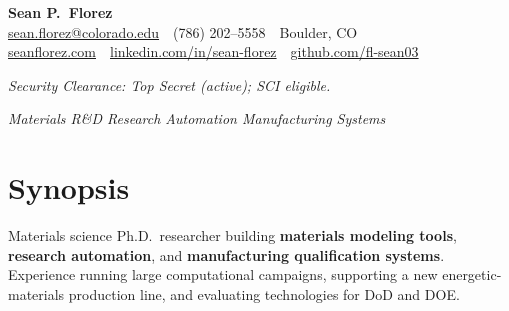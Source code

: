 \documentclass[letterpaper,10pt]{article}
\newcommand{\keepsection}{\needspace{6\baselineskip}}
\begin{document}
\pagestyle{empty}

\begin{center}
    {\LARGE \textbf{Sean P.\ Florez}}\\
    \href{mailto:sean.florez@colorado.edu}{sean.florez@colorado.edu} \,\textbar\, (786) 202--5558 \,\textbar\, Boulder, CO\\
    \href{https://seanflorez.com}{seanflorez.com} \,\textbar\,
    \href{https://linkedin.com/in/sean-florez}{linkedin.com/in/sean-florez} \,\textbar\,
    \href{https://github.com/fl-sean03}{github.com/fl-sean03}
\end{center}

\vspace{-2pt}
\begin{center}
\textit{Security Clearance: Top Secret (active); SCI eligible.}
\end{center}

\vspace{-6pt}
\begin{center}
\textit{Materials R\&D \;\textbar\; Research Automation \;\textbar\; Manufacturing Systems}
\end{center}

\keepsection\section*{Synopsis}
Materials science Ph.D.\ researcher building \textbf{materials modeling tools}, \textbf{research automation}, and \textbf{manufacturing qualification systems}. Experience running large computational campaigns, supporting a new energetic-materials production line, and evaluating technologies for DoD and DOE.
\end{document}
